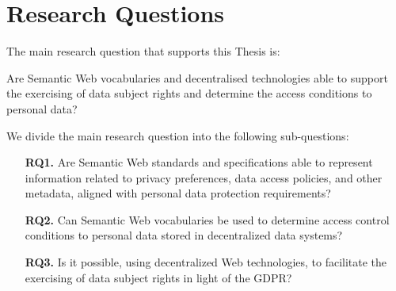 \section{Research Questions}
\label{sec:rqs}

The main research question that supports this Thesis is:

\begin{tcolorbox}[colback=royallavender!20]
Are Semantic Web vocabularies and decentralised technologies able to support the exercising of data subject rights and determine the access conditions to personal data?
\end{tcolorbox}

We divide the main research question into the following sub-questions:

\begin{enumerate}
    \item [\textbf{RQ1.}] Are Semantic Web standards and specifications able to represent information related to privacy preferences, data access policies, and other metadata, aligned with personal data protection requirements?
    \item [\textbf{RQ2.}] Can Semantic Web vocabularies be used to determine access control conditions to personal data stored in decentralized data systems?
    \item [\textbf{RQ3.}] Is it possible, using decentralized Web technologies, to facilitate the exercising of data subject rights in light of the GDPR?
\end{enumerate}
